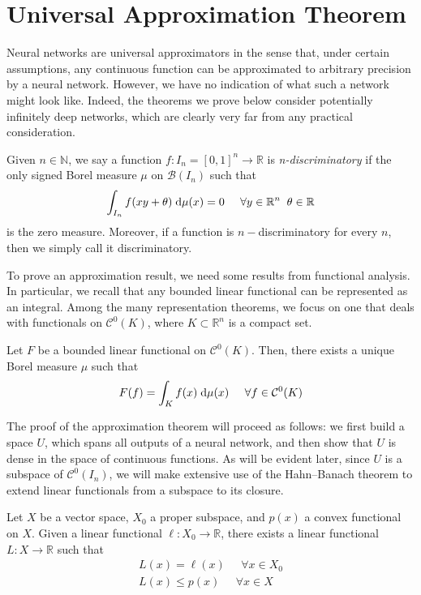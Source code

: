 \documentclass{article}
\numberwithin{equation}{subsection}
\begin{document}
\section{Universal Approximation Theorem}
Neural networks are universal approximators in the sense that, under certain assumptions, any continuous function can be approximated to arbitrary precision by a neural network. However, we have no indication of what such a network might look like. Indeed, the theorems we prove below consider potentially infinitely deep networks, which are clearly very far from any practical consideration.

Given $n \in \mathbb{N}$, we say a function $f : I_n = [0,1]^n \to \mathbb{R}$ is \textit{n-discriminatory} if the only signed Borel measure $\mu$ on $\mathcal{B}(I_n)$ such that
\begin{equation*}
    \int_{I_n} f(xy+\theta) \;\text{d} \mu(x) = 0 \;\;\;\;\; \forall y \in \mathbb{R}^n \;\; \theta \in \mathbb{R}
\end{equation*}
is the zero measure. Moreover, if a function is $n-$discriminatory for every $n$, then we simply call it discriminatory.

To prove an approximation result, we need some results from functional analysis. In particular, we recall that any bounded linear functional can be represented as an integral. Among the many representation theorems, we focus on one that deals with functionals on $\mathcal{C}^0(K)$, where $K \subset \mathbb{R}^n$ is a compact set.

\begin{theorem}[Representation]
    Let $F$ be a bounded linear functional on $\mathcal{C}^0(K)$. Then, there exists a unique Borel measure $\mu$ such that 
    \begin{equation*}
        F(f) = \int_K f(x) \;\text{d} \mu(x) \;\;\;\;\; \forall f \in \mathcal{C}^0(K)
    \end{equation*}
\end{theorem}

The proof of the approximation theorem will proceed as follows: we first build a space $U$, which spans all outputs of a neural network, and then show that $U$ is dense in the space of continuous functions. As will be evident later, since $U$ is a subspace of $\mathcal{C}^{0}(I_n)$, we will make extensive use of the Hahn–Banach theorem to extend linear functionals from a subspace to its closure.

\begin{theorem}
    Let $X$ be a vector space, $X_0$ a proper subspace, and $p(x)$ a convex functional on $X$. Given a linear functional $\ell : X_0 \to \mathbb{R}$, there exists a linear functional $L : X \to \mathbb{R}$ such that
    \begin{gather*}
        L(x) = \ell(x) \;\;\;\;\; \forall x \in X_0 \\
        L(x) \leq p(x) \;\;\;\;\; \forall x \in X
    \end{gather*}
\end{theorem}
\end{document}
